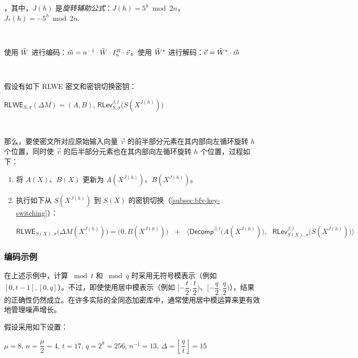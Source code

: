 \begin{tcolorbox}[title={\textbf{\tboxlabel{\ref*{subsec:bfv-rotation}} BFV 输入向量槽位的同态旋转}}]
$ $

$ $

，其中，$J(h)$ 是\textit{旋转辅助公式}：$J(h) = 5^h \bmod 2n$，
\text{ } $J_*(h) = -5^h \bmod 2n$. 

$ $

使用 $\tilde{W}$ 进行编码：$\vec{m} = n^{-1}\cdot \tilde{W} \cdot I_n^R \cdot \vec{v}$。使用 $\tilde{W}^*$ 进行解码：$\vec{v} = \tilde{W}^* \cdot \vec{m}$

$ $

假设有如下 RLWE 密文和密钥切换密钥：

$\textsf{RLWE}_{S, \sigma}(\Delta M) = (A, B)$, \text{ } $\textsf{RLev}_{S, \sigma}^{\beta, l}\bm(S(X^{J(h)})\bm)$

$ $

那么，要使密文所对应原始输入向量 $\vec{v}$ 的前半部分元素在其内部向左循环旋转 $h$ 个位置，同时使 $\vec{v}$ 的后半部分元素也在其内部向左循环旋转 $h$ 个位置，过程如下：

\begin{enumerate}
\item 将 $A(X)$、$B(X)$ 更新为 $A(X^{J(h)})$、$B(X^{J(h)})$。
\item 执行如下从 $S(X^{J(h)})$ 到 $S(X)$ 的密钥切换（\autoref{subsec:bfv-key-switching}）：

$\textsf{RLWE}_{S(X),\sigma}\bm{(}\Delta M(X^{J(h)})\bm{)} = \bm{(} 0, B(X^{J(h)}) \bm{)} \text{ } + \text{ } \bm{\langle}  \textsf{Decomp}^{\beta, l}\bm{(}A(X^{J(h)})\bm{)}, \text{ } \textsf{RLev}_{S(X), \sigma}^{\beta, l}\bm{(}S(X^{J(h)})\bm{)} \bm{\rangle}$
\end{enumerate}


\end{tcolorbox}


\subsubsection{编码示例}
\label{subsubsec:bfv-batch-encoding-ex}



在上述示例中，计算 $\bmod t$ 和 $\bmod q$ 时采用无符号模表示（例如 $[0, t-1], [0, q]$）。不过，即使使用居中模表示（例如 $[-\dfrac{t}{2}, \dfrac{t}{2})$、$[-\dfrac{q}{2}, \dfrac{q}{2})$），结果的正确性仍然成立。在许多实际的全同态加密库中，通常使用居中模运算来更有效地管理噪声增长。

假设采用如下设置：

$\mu = 8, \, n = \dfrac{\mu}{2} = 4, \, t = 17, \, q = 2^8 = 256, \, n^{-1} = 13, \, \Delta = \left\lfloor\dfrac{q}{t}\right\rfloor = 15$

